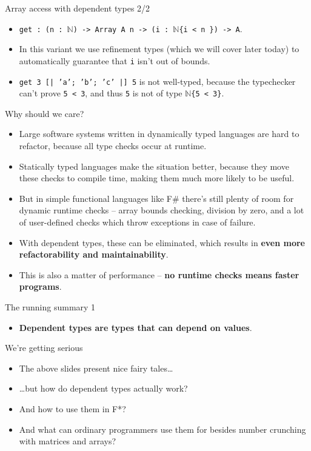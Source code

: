 \documentclass{beamer}
\newcommand{\m}[1]{\texttt{#1}}
\begin{document}
\begin{frame}{Array access with dependent types 2/2}
\begin{itemize}
	\item \m{get :\ (n :\ $\mathbb{N}$) -> Array A n -> (i :\ $\mathbb{N}$\{i < n \}) -> A}.
	\item In this variant we use refinement types (which we will cover later today) to automatically guarantee that \m{i} isn't out of bounds.
	\item \m{get 3 [| 'a'; 'b'; 'c' |] 5} is not well-typed, because the typechecker can't prove \m{5 < 3}, and thus \m{5} is not of type \m{$\mathbb{N}$\{5 < 3\}}.
\end{itemize}
\end{frame}

\begin{frame}{Why should we care?}
\begin{itemize}
	\item Large software systems written in dynamically typed languages are hard to refactor, because all type checks occur at runtime.
	\item Statically typed languages make the situation better, because they move these checks to compile time, making them much more likely to be useful.
	\item But in simple functional languages like F\# there's still plenty of room for dynamic runtime checks -- array bounds checking, division by zero, and a lot of user-defined checks which throw exceptions in case of failure.
	\item With dependent types, these can be eliminated, which results in \textbf{even more refactorability and maintainability}.
	\item This is also a matter of performance -- \textbf{no runtime checks means faster programs}.
\end{itemize}
\end{frame}

\begin{frame}{The running summary 1}
\begin{itemize}
	\item \textbf{Dependent types are types that can depend on values}.
\end{itemize}
\end{frame}

\begin{frame}{We're getting serious}
\begin{itemize}
	\item The above slides present nice fairy tales\dots
	\item \dots but how do dependent types actually work?
	\item And how to use them in F*?
	\item And what can ordinary programmers use them for besides number crunching with matrices and arrays?
\end{itemize}
\end{frame}
\end{document}
